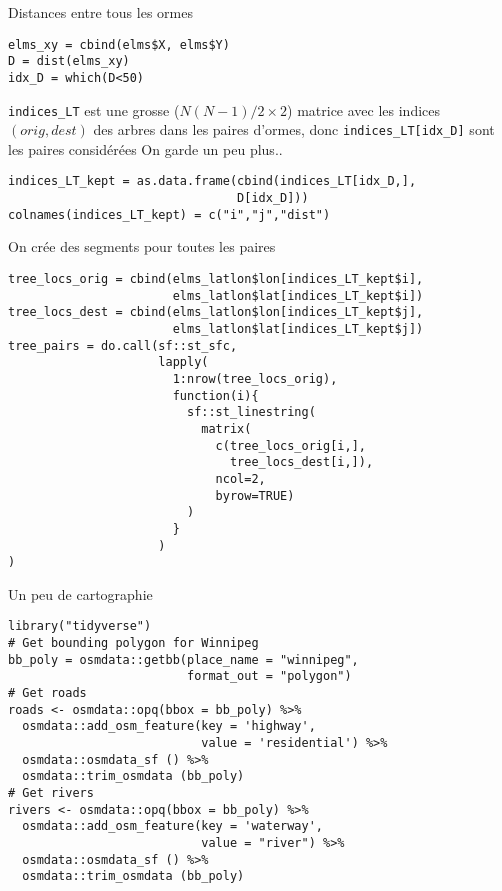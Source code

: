 \documentclass[
  ignorenonframetext,
]{beamer}
\begin{document}
\begin{frame}[fragile]{Distances entre tous les ormes}
\protect\hypertarget{distances-entre-tous-les-ormes}{}
\begin{verbatim}
elms_xy = cbind(elms$X, elms$Y)
D = dist(elms_xy)
idx_D = which(D<50)
\end{verbatim}

\texttt{indices\_LT} est une grosse (\(N(N-1)/2\times 2\)) matrice avec
les indices \((orig,dest)\) des arbres dans les paires d'ormes, donc
\texttt{indices\_LT{[}idx\_D{]}} sont les paires considérées \vfill On
garde un peu plus..

\begin{verbatim}
indices_LT_kept = as.data.frame(cbind(indices_LT[idx_D,],
                                D[idx_D]))
colnames(indices_LT_kept) = c("i","j","dist")
\end{verbatim}
\end{frame}

\begin{frame}[fragile]{On crée des segments pour toutes les paires}
\protect\hypertarget{on-cruxe9e-des-segments-pour-toutes-les-paires}{}
\begin{verbatim}
tree_locs_orig = cbind(elms_latlon$lon[indices_LT_kept$i],
                       elms_latlon$lat[indices_LT_kept$i])
tree_locs_dest = cbind(elms_latlon$lon[indices_LT_kept$j],
                       elms_latlon$lat[indices_LT_kept$j])
tree_pairs = do.call(sf::st_sfc,
                     lapply(
                       1:nrow(tree_locs_orig),
                       function(i){
                         sf::st_linestring(
                           matrix(
                             c(tree_locs_orig[i,],
                               tree_locs_dest[i,]), 
                             ncol=2,
                             byrow=TRUE)
                         )
                       }
                     )
)
\end{verbatim}
\end{frame}

\begin{frame}[fragile]{Un peu de cartographie}
\protect\hypertarget{un-peu-de-cartographie}{}
\begin{verbatim}
library("tidyverse")
# Get bounding polygon for Winnipeg
bb_poly = osmdata::getbb(place_name = "winnipeg", 
                         format_out = "polygon")
# Get roads
roads <- osmdata::opq(bbox = bb_poly) %>%
  osmdata::add_osm_feature(key = 'highway', 
                           value = 'residential') %>%
  osmdata::osmdata_sf () %>%
  osmdata::trim_osmdata (bb_poly)
# Get rivers
rivers <- osmdata::opq(bbox = bb_poly) %>%
  osmdata::add_osm_feature(key = 'waterway', 
                           value = "river") %>%
  osmdata::osmdata_sf () %>%
  osmdata::trim_osmdata (bb_poly)
\end{verbatim}
\end{frame}
\end{document}
